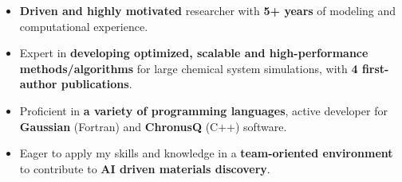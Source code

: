 
\begin{itemize}[label=$\bullet$]
    \item \textbf{Driven and highly motivated} researcher with \textbf{5+ years} of modeling and computational experience.
    \item Expert in \textbf{developing optimized, scalable and high-performance methods/algorithms} for large chemical system simulations, with \textbf{4 first-author publications}.
    \item Proficient in \textbf{a variety of programming languages}, active developer for \textbf{Gaussian} (Fortran) and \textbf{ChronusQ} (C++) software.
    \item Eager to apply my skills and knowledge in a \textbf{team-oriented environment} to contribute to \textbf{AI driven materials discovery}.
\end{itemize}